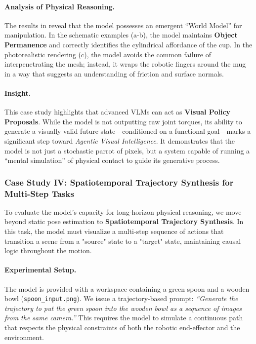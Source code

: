 \paragraph{Analysis of Physical Reasoning.}
The results in  reveal that the model possesses an emergent ``World Model'' for manipulation. In the schematic examples (a-b), the model maintains \textbf{Object Permanence} and correctly identifies the cylindrical affordance of the cup. In the photorealistic rendering (c), the model avoids the common failure of interpenetrating the mesh; instead, it wraps the robotic fingers around the mug in a way that suggests an understanding of friction and surface normals.

\paragraph{Insight.}
This case study highlights that advanced VLMs can act as \textbf{Visual Policy Proposals}. While the model is not outputting raw joint torques, its ability to generate a visually valid future state—conditioned on a functional goal—marks a significant step toward \textit{Agentic Visual Intelligence}. It demonstrates that the model is not just a stochastic parrot of pixels, but a system capable of running a ``mental simulation'' of physical contact to guide its generative process.

\subsubsection{Case Study IV: Spatiotemporal Trajectory Synthesis for Multi-Step Tasks}
\label{subsubsec:trajectory_synthesis}

To evaluate the model's capacity for long-horizon physical reasoning, we move beyond static pose estimation to \textbf{Spatiotemporal Trajectory Synthesis}. In this task, the model must visualize a multi-step sequence of actions that transition a scene from a "source" state to a "target" state, maintaining causal logic throughout the motion.

\paragraph{Experimental Setup.}
The model is provided with a workspace containing a green spoon and a wooden bowl (\texttt{spoon\_input.png}). We issue a trajectory-based prompt: \textit{``Generate the trajectory to put the green spoon into the wooden bowl as a sequence of images from the same camera.''} This requires the model to simulate a continuous path that respects the physical constraints of both the robotic end-effector and the environment.

